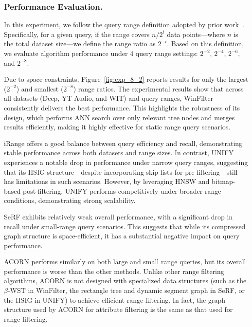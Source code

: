 \documentclass[sigconf, nonacm]{acmart}
\begin{document}
	
	\subsubsection{Performance Evaluation. }
	
	In this experiment, we follow the query range definition adopted by prior work~\cite{HQI}. Specifically, for a given query, if the range covers $n/2^i$ data points—where $n$ is the total dataset size—we define the range ratio as $2^{-i}$. Based on this definition, we evaluate algorithm performance under 4 query range settings: $2^{-2}$, $2^{-4}$, $2^{-6}$, and $2^{-8}$.
	
	Due to space constraints, Figure~\ref{fig:exp_8_2} reports results for only the largest ($2^{-2}$) and smallest ($2^{-8}$) range ratios. The experimental results show that across all datasets (Deep, YT-Audio, and WIT) and query ranges, WinFilter consistently delivers the best performance. This highlights the robustness of its design, which performs ANN search over only relevant tree nodes and merges results efficiently, making it highly effective for static range query scenarios.
	
	iRange offers a good balance between query efficiency and recall, demonstrating stable performance across both datasets and range sizes. In contrast, UNIFY experiences a notable drop in performance under narrow query ranges, suggesting that its HSIG structure—despite incorporating skip lists for pre-filtering—still has limitations in such scenarios. However, by leveraging HNSW and bitmap-based post-filtering, UNIFY performs competitively under broader range conditions, demonstrating strong scalability.
	
	SeRF exhibits relatively weak overall performance, with a significant drop in recall under small-range query scenarios. This suggests that while its compressed graph structure is space-efficient, it has a substantial negative impact on query performance.
	
	ACORN performs similarly on both large and small range queries, but its overall performance is worse than the other methods. Unlike other range filtering algorithms, ACORN is not designed with specialized data structures (such as the $\beta$-WST in WinFilter, the rectangle tree and dynamic segment graph in SeRF, or the HSIG in UNIFY) to achieve efficient range filtering. In fact, the graph structure used by ACORN for attribute filtering is the same as that used for range filtering.
	
\end{document}
